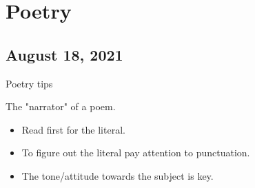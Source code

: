 \documentclass{scrreprt} %
\begin{document}
\section{Poetry}

\subsection{August 18, 2021}

Poetry tips

\begin{definition}[Speaker]
	The "narrator" of a poem.
\end{definition}

\begin{itemize}
	\item Read first for the literal.
	\item To figure out the literal pay attention to punctuation.
	\item The tone/attitude
	towards the subject is key.
\end{itemize}
\end{document}
